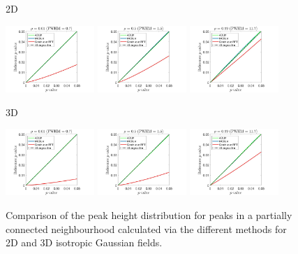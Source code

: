 \documentclass{article}
\begin{document}
\begin{figure}[!htp]
\centering
\begin{sideways}
\phantom{------------------}2D
\end{sideways}
\includegraphics[trim=80 5 80 5, clip,width=0.3\textwidth]{figure/2D_rho0.01_nondiag.jpg}
\includegraphics[trim=80 5 80 5, clip,width=0.3\textwidth]{figure/2D_rho0.5_nondiag.jpg}
\includegraphics[trim=80 5 80 5, clip,width=0.3\textwidth]{figure/2D_rho0.99_nondiag.jpg}

\begin{sideways}
\phantom{------------------}3D
\end{sideways}
\includegraphics[trim=80 5 80 5, clip,width=0.3\textwidth]{figure/3D_rho0.01_nondiag.jpg}
\includegraphics[trim=80 5 80 5, clip,width=0.3\textwidth]{figure/3D_rho0.5_nondiag.jpg}
\includegraphics[trim=80 5 80 5, clip,width=0.3\textwidth]{figure/3D_rho0.99_nondiag.jpg}
\caption{Comparison of the peak height distribution for peaks in a partially connected neighbourhood calculated via the different methods for 2D and 3D isotropic Gaussian fields. \label{fig8}}
\end{figure}
\end{document}
